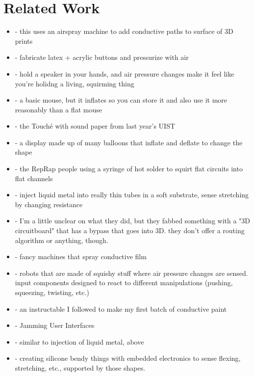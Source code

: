\section{Related Work}

\begin{itemize}
\item \cite{Sarik-tracebrush} - this uses an airspray machine to add conductive paths to surface of 3D prints
\item \cite{Harrison-buttons} - fabricate latex + acrylic buttons and pressurize with air
\item \cite{Hashimoto-squirming} - hold a speaker in your hands, and air pressure changes make it feel like you're holidng a living, squirming thing
\item \cite{Kim-inflatablemouse} - a basic mouse, but it inflates so you can store it and also use it more reasonably than a flat mouse
\item \cite{Ono-touchandactivate} - the Touch\'{e} with sound paper from last year's UIST
\item \cite{Iwata-volflex} - a display made up of many balloons that inflate and deflate to change the shape
\item \cite{Sells-reprap} - the RepRap people using a syringe of hot solder to squirt flat circuits into flat channels
\item \cite{Majidi-curvature} - inject liquid metal into really thin tubes in a soft substrate, sense stretching by changing resistance
\item \cite{Navarrette-gps} - I'm a little unclear on what they did, but they fabbed something with a "3D circuitboard" that has a bypass that goes into 3D.  they don't offer a routing algorithm or anything, though.
\item \cite{Optomec} - fancy machines that spray conductive film
\item \cite{Slyper-pressure} - robots that are made of squishy stuff where air pressure changes are sensed.  input components designed to react to different manipulations (pushing, squeezing, twisting, etc.)
\item \cite{icecats-conductivepaint} - an instructable I followed to make my first batch of conductive paint
\item \cite{Follmer-jamming} - Jamming User Interfaces
\item \cite{Park-microchannels} - similar to injection of liquid metal, above
\item \cite{Slyper-shape} - creating silicone bendy things with embedded electronics to sense flexing, stretching, etc., supported by those shapes.

\end{itemize}
